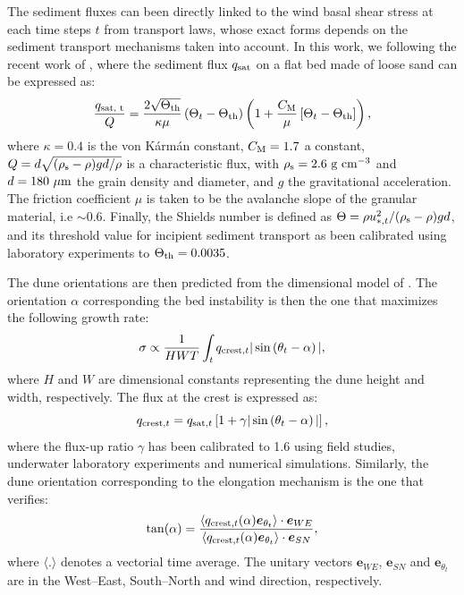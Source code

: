 The sediment fluxes can been directly linked to the wind basal shear stress at each time steps $t$ from transport laws, whose exact forms depends on the sediment transport mechanisms taken into account. In this work, we following the recent work of \citet{Pahtz2020}, where the sediment flux $q_{\textup{sat}}$ on a flat bed made of loose sand can be expressed as:
\begin{equation}
  \label{transport_law}
  \frac{q_{\textup{sat, t}}}{Q} = \frac{2\sqrt{\Theta_{\textup{th}}}}{\kappa\mu}\left(\Theta_{t} - \Theta_{\textup{th}}\right)\left(1 +\frac{C_{\textup{M}}}{\mu}\left[\Theta_{t} - \Theta_{\textup{th}}\right]\right),
\end{equation}
where $\kappa = 0.4$ is the von Kármán constant, $C_{\rm M}=1.7$ a constant, $Q = d\sqrt{(\rho_{\textup{s}} - \rho)gd/\rho}$ is a characteristic flux, with $\rho_{\textup{s}} = 2.6~\textup{g}~\textup{cm}^{-3}$ and $d=180~\mu\textup{m}$ the grain density and diameter, and $g$ the gravitational acceleration. The friction coefficient $\mu$ is taken to be the avalanche slope of the granular material, i.e $\sim 0.6$. Finally, the Shields number is defined as $\Theta = \rho u_{*, t}^{2}/(\rho_{\textup{s}} - \rho)gd$, and its threshold value for incipient sediment transport as been calibrated using laboratory experiments to $\Theta_{\textup{th}} = 0.0035$.

The dune orientations are then predicted from the dimensional model of \citet{Courrech2014}. The orientation $\alpha$ corresponding the bed instability is then the one that maximizes the following growth rate:
\begin{equation}
  \sigma \propto \frac{1}{H W T}\int_{t}  q_{\textup{crest}, t}\vert \sin\left(\theta_{t} - \alpha\right) \vert,
\end{equation}
where $H$ and $W$ are dimensional constants representing the dune height and width, respectively. The flux at the crest is expressed as:
\begin{equation}
  q_{\textup{crest}, t} = q_{\textup{sat}, t}\left[1 + \gamma\vert\sin\left(\theta_{t} - \alpha\right)\vert\right],
\end{equation}
where the flux-up ratio $\gamma$ has been calibrated to 1.6 using field studies, underwater laboratory experiments and numerical simulations. Similarly, the dune orientation corresponding to the elongation mechanism is the one that verifies:
\begin{equation}
  \tan(\alpha) = \frac{\langle q_{\textup{crest}, t}(\alpha) \boldsymbol{e}_{\theta_{t}}\rangle \cdot \boldsymbol{e}_{WE} }{ \langle q_{\textup{crest}, t}(\alpha) \boldsymbol{e}_{\theta_{t}} \rangle \cdot \boldsymbol{e}_{SN}},
\end{equation}
where $\langle.\rangle$ denotes a vectorial time average. The unitary vectors $\boldsymbol{e}_{WE}$, $\boldsymbol{e}_{SN}$ and $\boldsymbol{e}_{\theta_{t}}$ are in the West--East, South--North and wind direction, respectively.

